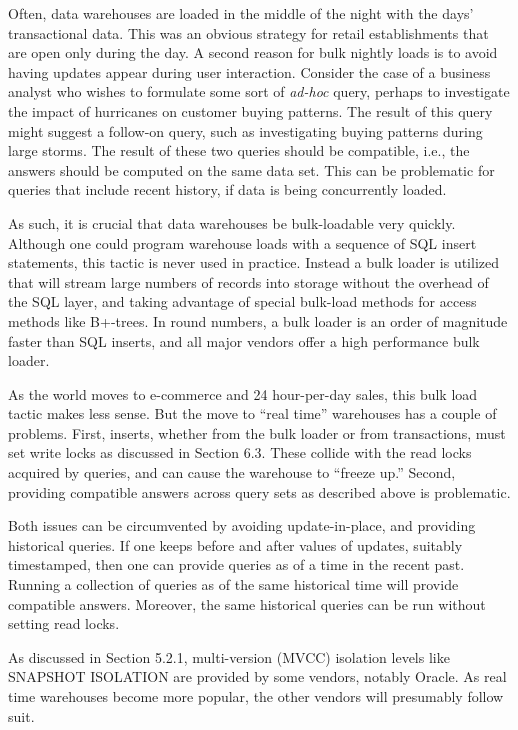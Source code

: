 \documentclass[a4paper,11pt,twoside,openright]{book}
\begin{document}
Often, data warehouses are loaded in the middle of the night with the
days' transactional data. This was an obvious strategy for retail
establishments that are open only during the day. A second reason for
bulk nightly loads is to avoid having updates appear during user
interaction. Consider the case of a business analyst who wishes to
formulate some sort of \emph{ad-hoc} query, perhaps to investigate the
impact of hurricanes on customer buying patterns. The result of this
query might suggest a follow-on query, such as investigating buying
patterns during large storms. The result of these two queries should be
compatible, i.e., the answers should be computed on the same data set.
This can be problematic for queries that include recent history, if data
is being concurrently loaded.

As such, it is crucial that data warehouses be bulk-loadable very
quickly. Although one could program warehouse loads with a sequence of
SQL insert statements, this tactic is never used in practice. Instead a
bulk loader is utilized that will stream large numbers of records into
storage without the overhead of the SQL layer, and taking advantage of
special bulk-load methods for access methods like B+-trees. In round
numbers, a bulk loader is an order of magnitude faster than SQL inserts,
and all major vendors offer a high performance bulk loader.

As the world moves to e-commerce and 24 hour-per-day sales, this bulk
load tactic makes less sense. But the move to ``real time'' warehouses
has a couple of problems. First, inserts, whether from the bulk loader
or from transactions, must set write locks as discussed in Section 6.3.
These collide with the read locks acquired by queries, and can cause the
warehouse to ``freeze up.'' Second, providing compatible answers across
query sets as described above is problematic.

Both issues can be circumvented by avoiding update-in-place, and
providing historical queries. If one keeps before and after values of
updates, suitably timestamped, then one can provide queries as of a time
in the recent past. Running a collection of queries as of the same
historical time will provide compatible answers. Moreover, the same
historical queries can be run without setting read locks.

As discussed in Section 5.2.1, multi-version (MVCC) isolation levels
like SNAPSHOT ISOLATION are provided by some vendors, notably Oracle. As
real time warehouses become more popular, the other vendors will
presumably follow suit.
\end{document}
